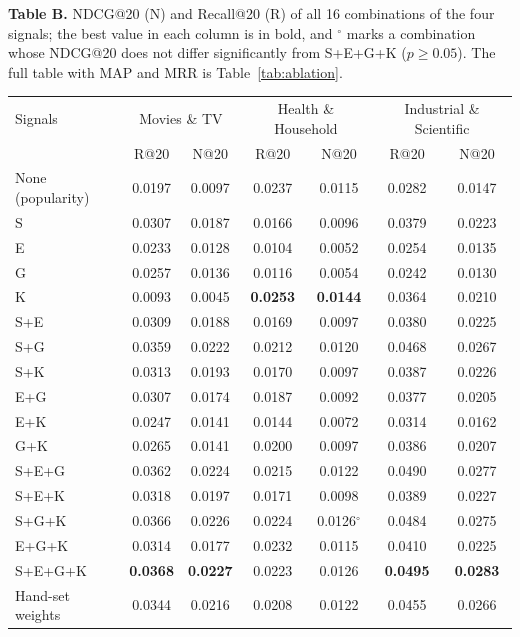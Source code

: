 \documentclass[10pt]{article}
\let\colrule\midrule
\let\botrule\bottomrule
\newcounter{rc}
\begin{document}
\begin{center}
\footnotesize
\textbf{Table B.} NDCG@20 (N) and Recall@20 (R) of all 16 combinations of the four signals; the best value in each column is in bold, and $^{\circ}$ marks a combination whose NDCG@20 does not differ significantly from S+E+G+K ($p\geq 0.05$). The full table with MAP and MRR is Table~\ref{tab:ablation}.\\[3pt]
\setlength{\tabcolsep}{3pt}
\begin{tabular*}{\linewidth}{@{\extracolsep{\fill}}lcccccc@{}}
\toprule
Signals & \multicolumn{2}{c}{Movies \& TV} & \multicolumn{2}{c}{Health \& Household} & \multicolumn{2}{c}{Industrial \& Scientific} \\
 & R@20 & N@20 & R@20 & N@20 & R@20 & N@20 \\
\colrule
None (popularity) & 0.0197 & 0.0097 & 0.0237 & 0.0115 & 0.0282 & 0.0147 \\
\colrule
S & 0.0307 & 0.0187 & 0.0166 & 0.0096 & 0.0379 & 0.0223 \\
E & 0.0233 & 0.0128 & 0.0104 & 0.0052 & 0.0254 & 0.0135 \\
G & 0.0257 & 0.0136 & 0.0116 & 0.0054 & 0.0242 & 0.0130 \\
K & 0.0093 & 0.0045 & \textbf{0.0253} & \textbf{0.0144} & 0.0364 & 0.0210 \\
\colrule
S+E & 0.0309 & 0.0188 & 0.0169 & 0.0097 & 0.0380 & 0.0225 \\
S+G & 0.0359 & 0.0222 & 0.0212 & 0.0120 & 0.0468 & 0.0267 \\
S+K & 0.0313 & 0.0193 & 0.0170 & 0.0097 & 0.0387 & 0.0226 \\
E+G & 0.0307 & 0.0174 & 0.0187 & 0.0092 & 0.0377 & 0.0205 \\
E+K & 0.0247 & 0.0141 & 0.0144 & 0.0072 & 0.0314 & 0.0162 \\
G+K & 0.0265 & 0.0141 & 0.0200 & 0.0097 & 0.0386 & 0.0207 \\
\colrule
S+E+G & 0.0362 & 0.0224 & 0.0215 & 0.0122 & 0.0490 & 0.0277 \\
S+E+K & 0.0318 & 0.0197 & 0.0171 & 0.0098 & 0.0389 & 0.0227 \\
S+G+K & 0.0366 & 0.0226 & 0.0224 & 0.0126$^{\circ}$ & 0.0484 & 0.0275 \\
E+G+K & 0.0314 & 0.0177 & 0.0232 & 0.0115 & 0.0410 & 0.0225 \\
\colrule
S+E+G+K & \textbf{0.0368} & \textbf{0.0227} & 0.0223 & 0.0126 & \textbf{0.0495} & \textbf{0.0283} \\
\colrule
Hand-set weights & 0.0344 & 0.0216 & 0.0208 & 0.0122 & 0.0455 & 0.0266 \\
\botrule
\end{tabular*}
\end{center}
\end{document}
